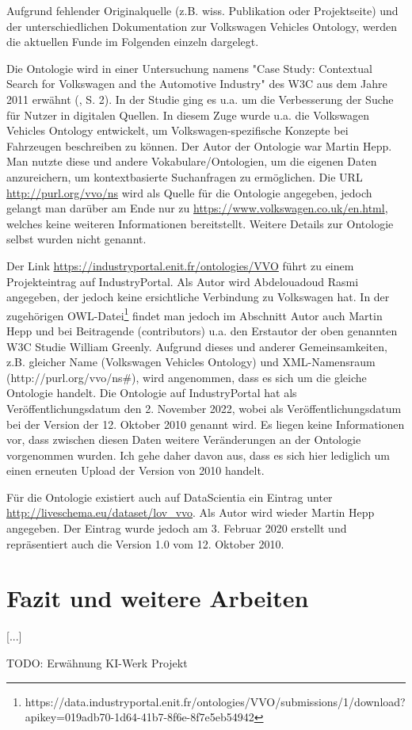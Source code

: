 \documentclass{article}
\begin{document}
Aufgrund fehlender Originalquelle (z.B. wiss. Publikation oder Projektseite) und der unterschiedlichen Dokumentation zur Volkswagen Vehicles Ontology, werden die aktuellen Funde im Folgenden einzeln dargelegt.

Die Ontologie wird in einer Untersuchung namens "Case Study: Contextual Search for Volkswagen and the Automotive Industry" des W3C aus dem Jahre 2011 erwähnt (\cite{greenly2011case}, S. 2).
In der Studie ging es u.a. um die Verbesserung der Suche für Nutzer in digitalen Quellen.
In diesem Zuge wurde u.a. die Volkswagen Vehicles Ontology entwickelt, um Volkswagen-spezifische Konzepte bei Fahrzeugen beschreiben zu können.
Der Autor der Ontologie war Martin Hepp.
Man nutzte diese und andere Vokabulare/Ontologien, um die eigenen Daten anzureichern, um kontextbasierte Suchanfragen zu ermöglichen.
Die URL \url{http://purl.org/vvo/ns} wird als Quelle für die Ontologie angegeben, jedoch gelangt man darüber am Ende nur zu \url{https://www.volkswagen.co.uk/en.html}, welches keine weiteren Informationen bereitstellt.
Weitere Details zur Ontologie selbst wurden nicht genannt.

Der Link \url{https://industryportal.enit.fr/ontologies/VVO} führt zu einem Projekteintrag auf IndustryPortal.
Als Autor wird Abdelouadoud Rasmi angegeben, der jedoch keine ersichtliche Verbindung zu Volkswagen hat.
In der zugehörigen OWL-Datei\footnote{https://data.industryportal.enit.fr/ontologies/VVO/submissions/1/download?apikey=019adb70-1d64-41b7-8f6e-8f7e5eb54942} findet man jedoch im Abschnitt Autor auch Martin Hepp und bei Beitragende (contributors) u.a. den Erstautor der oben genannten W3C Studie William Greenly.
Aufgrund dieses und anderer Gemeinsamkeiten, z.B. gleicher Name (Volkswagen Vehicles Ontology) und XML-Namensraum (http://purl.org/vvo/ns\#), wird angenommen, dass es sich um die gleiche Ontologie handelt. Die Ontologie auf IndustryPortal hat als Veröffentlichungsdatum den 2. November 2022, wobei als Veröffentlichungsdatum bei der Version der 12. Oktober 2010 genannt wird.
Es liegen keine Informationen vor, dass zwischen diesen Daten weitere Veränderungen an der Ontologie vorgenommen wurden.
Ich gehe daher davon aus, dass es sich hier lediglich um einen erneuten Upload der Version von 2010 handelt.

Für die Ontologie existiert auch auf DataScientia ein Eintrag unter \url{http://liveschema.eu/dataset/lov\_vvo}.
Als Autor wird wieder Martin Hepp angegeben.
Der Eintrag wurde jedoch am 3. Februar 2020 erstellt und repräsentiert auch die Version 1.0 vom 12. Oktober 2010.


\section{Fazit und weitere Arbeiten}

[...]

TODO: Erwähnung KI-Werk Projekt



\medskip

\printbibliography
\end{document}

